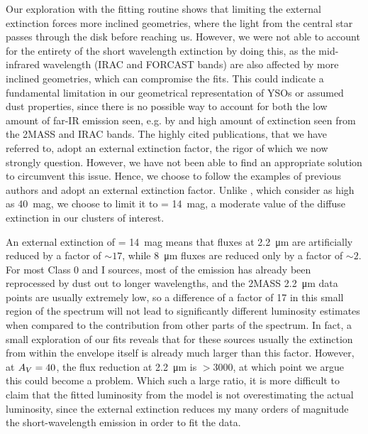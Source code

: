 Our exploration with the fitting routine shows that limiting the external extinction forces more inclined geometries, where the light from the central star passes through the disk before reaching us. However, we were not able to account for the entirety of the short wavelength extinction by doing this, as the mid-infrared wavelength (IRAC and FORCAST bands) are also affected by more inclined geometries, which can compromise the fits. This could indicate a fundamental limitation in our geometrical representation of YSOs or assumed dust properties, since there is no possible way to account for both the low amount of far-IR emission seen, e.g. by \Herschel and high amount of extinction seen from the 2MASS and IRAC bands. The highly cited publications, that we have referred to, adopt an external extinction factor, the rigor of which we now strongly question. However, we have not been able to find an appropriate solution to circumvent this issue.  Hence, we choose to follow the examples of previous authors and adopt an external extinction factor. Unlike \citet{Furlan:2016df}, which consider \Av as high as 40~mag, we choose to limit it to \Av = 14~mag, a moderate value of the diffuse extinction in our clusters of interest. 

An external extinction of \Av = 14~mag means that fluxes at \SI{2.2}{\um} are artificially reduced by a factor of $\sim 17$, while \SI{8}{\um} fluxes are reduced only by a factor of $\sim 2$. For most Class 0 and I sources, most of the emission has already been reprocessed by dust out to longer wavelengths, and the 2MASS \SI{2.2}{\um} data points are usually extremely low, so a difference of a factor of 17 in this small region of the spectrum will not lead to significantly different luminosity estimates when compared to the contribution from other parts of the spectrum. In fact, a small exploration of our fits reveals that for these sources usually the extinction from within the envelope itself is already much larger than this factor. However, at $A_V = 40$, the flux reduction at \SI{2.2}{\um} is $>3000$, at which point we argue this could become a problem. Which such a large ratio, it is more difficult to claim that the fitted luminosity from the model is not overestimating the actual luminosity, since the external extinction reduces my many orders of magnitude the short-wavelength emission in order to fit the data. 

